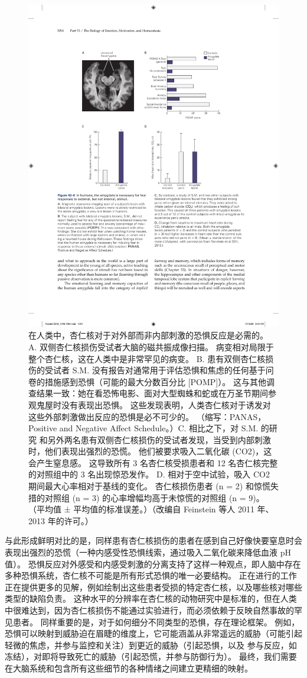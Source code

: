 \begin{figure}[htbp]
	\centering
	\includegraphics[width=0.7\linewidth]{chap42/fig_42_6}
	\caption{在人类中，杏仁核对于对外部而非内部刺激的恐惧反应是必需的。 A. 双侧杏仁核损伤受试者大脑的磁共振成像扫描。 病变相对局限于整个杏仁核，这在人类中是非常罕见的病变。 B. 患有双侧杏仁核损伤的受试者 S.M. 没有报告对通常用于评估恐惧和焦虑的任何基于问卷的措施感到恐惧（可能的最大分数百分比 [POMP]）。 这与其他调查结果一致：她在看恐怖电影、面对大型蜘蛛和蛇或在万圣节期间参观鬼屋时没有表现出恐惧。 这些发现表明，人类杏仁核对于诱发对这些外部刺激做出反应的恐惧是必不可少的。 （缩写：PANAS，Positive and Negative Affect Schedule。）C. 相比之下，对 S.M. 的研究 和另外两名患有双侧杏仁核损伤的受试者发现，当受到内部刺激时，他们表现出强烈的恐慌。 他们被要求吸入二氧化碳 (CO2)，这会产生窒息感。 这导致所有 3 名杏仁核受损患者和 12 名杏仁核完整的对照组中的 3 名出现惊恐发作。 D. 相对于空中试验，吸入 CO2 期间最大心率相对于基线的变化。 杏仁核损伤患者 (n = 2) 和惊慌失措的对照组 (n = 3) 的心率增幅均高于未惊慌的对照组 (n = 9)。 （平均值 ± 平均值的标准误差。）（改编自 Feinstein 等人 2011 年、2013 年的许可。）}
	\label{fig:42_6}
\end{figure}

与此形成鲜明对比的是，同样患有杏仁核损伤的患者在感到自己好像快要窒息时会表现出强烈的恐慌（一种内感受性恐惧线索，通过吸入二氧化碳来降低血液 pH 值）。 恐惧反应对外感受和内感受刺激的分离支持了这样一种观点，即人脑中存在多种恐惧系统，杏仁核不可能是所有形式恐惧的唯一必要结构。 正在进行的工作正在提供更多的见解，例如绘制出这些患者受损的特定杏仁核，以及哪些核对哪些类型的缺陷负责。 这种水平的分辨率在杏仁核的动物研究中是标准的，但在人类中很难达到，因为杏仁核损伤不能通过实验进行，而必须依赖于反映自然事故的罕见患者。 同样重要的是，对于如何细分不同类型的恐惧，存在理论框架。 例如，恐惧可以映射到威胁迫在眉睫的维度上，它可能涵盖从非常遥远的威胁（可能引起轻微的焦虑，并参与监控和关注）到更近的威胁（引起恐惧，以及 参与反应，如冻结），对即将导致死亡的威胁（引起恐慌，并参与防御行为）。 最终，我们需要在大脑系统和包含所有这些细节的各种情绪之间建立更精细的映射。

